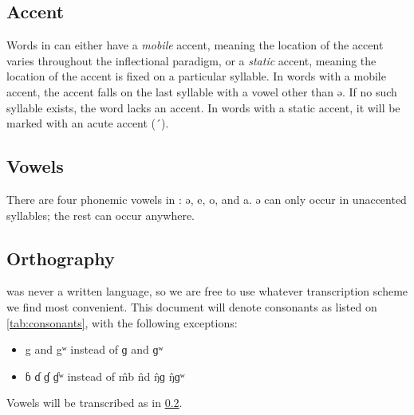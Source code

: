\subsection{Accent}
Words in \Langname{} can either have a \emph{mobile} accent, meaning the
location of the accent varies throughout the inflectional paradigm, or a
\emph{static} accent, meaning the location of the accent is fixed on a
particular syllable. In words with a mobile accent, the accent falls on the
last syllable with a vowel other than {\ll ə}. If no such syllable exists, the
word lacks an accent. In words with a static accent, it will be marked with an
acute accent (´).

\subsection{Vowels}
\label{sec:vowels}
There are four phonemic vowels in \Langname{}: {\ll ə}, {\ll e}, {\ll o}, and
{\ll a}. {\ll ə} can only occur in unaccented syllables; the rest can occur
anywhere.

\subsection{Orthography}
\Langname{} was never a written language, so we are free to use whatever
transcription scheme we find most convenient. This document will denote
consonants as listed on \cref{tab:consonants}, with the following exceptions:
\begin{itemize}
    \item {\ll g} and {\ll gʷ} instead of ɡ and ɡʷ
    \item {\ll ɓ ɗ ɠ ɠʷ} instead of \^mb \^nd \^ŋɡ \^ŋɡʷ
\end{itemize}
Vowels will be transcribed as in \cref{sec:vowels}.

